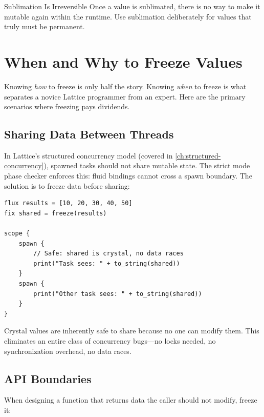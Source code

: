 \begin{warnbox}{Sublimation Is Irreversible}
Once a value is sublimated, there is no way to make it mutable again within the runtime.
Use sublimation deliberately for values that truly must be permanent.
\end{warnbox}


\section{When and Why to Freeze Values}\label{sec:when-to-freeze}


Knowing \emph{how} to freeze is only half the story.
Knowing \emph{when} to freeze is what separates a novice Lattice programmer from an expert.
Here are the primary scenarios where freezing pays dividends.

\subsection{Sharing Data Between Threads}

In Lattice's structured concurrency model (covered in \cref{ch:structured-concurrency}), spawned tasks should not share mutable state.
The strict mode phase checker enforces this: fluid bindings cannot cross a spawn boundary.
The solution is to freeze data before sharing:

\begin{lstlisting}[language=Lattice, caption={Freezing data for safe sharing across tasks}]
flux results = [10, 20, 30, 40, 50]
fix shared = freeze(results)

scope {
    spawn {
        // Safe: shared is crystal, no data races
        print("Task sees: " + to_string(shared))
    }
    spawn {
        print("Other task sees: " + to_string(shared))
    }
}
\end{lstlisting}

Crystal values are inherently safe to share because no one can modify them.
This eliminates an entire class of concurrency bugs---no locks needed, no synchronization overhead, no data races.

\subsection{API Boundaries}

When designing a function that returns data the caller should not modify, freeze it:

